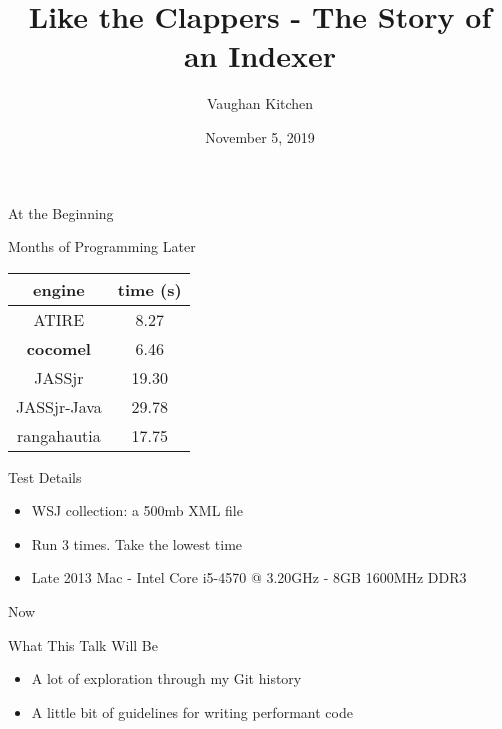 \documentclass{beamer}
\title{Like the Clappers - The Story of an Indexer}
\author{Vaughan Kitchen}
\date{November 5, 2019}
\begin{document}
\begin{frame}
\titlepage
\end{frame}

\begin{frame}{At the Beginning}

\end{frame}

\begin{frame}{Months of Programming Later}
	\begin{center}
	\begin{tabular}{c c}
		\textbf{engine} & \textbf{time (s)} \\
		\hline
		ATIRE & 8.27 \\
		\textbf{cocomel} & 6.46 \\
		JASSjr & 19.30 \\
		JASSjr-Java & 29.78 \\
		rangahautia & 17.75 \\
	\end{tabular}
	\end{center}
\end{frame}

\begin{frame}{Test Details}
	\begin{itemize}
	\item WSJ collection: a 500mb XML file
	\item Run 3 times. Take the lowest time
	\item Late 2013 Mac - Intel Core i5-4570 @ 3.20GHz - 8GB 1600MHz DDR3
	\end{itemize}
\end{frame}

\begin{frame}{Now}

\end{frame}

\begin{frame}{What This Talk Will Be}
	\begin{itemize}
	\item A lot of exploration through my Git history
	\item A little bit of guidelines for writing performant code
	\end{itemize}
\end{frame}
\end{document}
